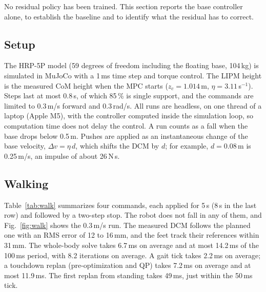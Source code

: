 \documentclass[conference]{IEEEtran}
\begin{document}
No residual policy has been trained.
This section reports the base controller alone, to establish the baseline and to identify what the residual has to correct.

\subsection{Setup}
The HRP-5P model (59 degrees of freedom including the floating base, 104\,kg) is simulated in MuJoCo \cite{todorov2012mujoco} with a 1\,ms time step and torque control.
The LIPM height is the measured CoM height when the MPC starts ($z_c=1.014$\,m, $\eta=3.11$\,s$^{-1}$).
Steps last at most 0.8\,s, of which 85\,\% is single support, and the commands are limited to 0.3\,m/s forward and 0.3\,rad/s.
All runs are headless, on one thread of a laptop (Apple M5), with the controller computed inside the simulation loop, so computation time does not delay the control.
A run counts as a fall when the base drops below 0.5\,m.
Pushes are applied as an instantaneous change of the base velocity, $\Delta v=\eta\,d$, which shifts the DCM by $d$; for example, $d=0.08$\,m is 0.25\,m/s, an impulse of about 26\,N\,s.

\subsection{Walking}
Table~\ref{tab:walk} summarizes four commands, each applied for 5\,s (8\,s in the last row) and followed by a two-step stop.
The robot does not fall in any of them, and Fig.~\ref{fig:walk} shows the 0.3\,m/s run.
The measured DCM follows the planned one with an RMS error of 12 to 16\,mm, and the feet track their references within 31\,mm.
The whole-body solve takes 6.7\,ms on average and at most 14.2\,ms of the 100\,ms period, with 8.2 iterations on average.
A gait tick takes 2.2\,ms on average; a touchdown replan (pre-optimization and QP) takes 7.2\,ms on average and at most 11.9\,ms.
The first replan from standing takes 49\,ms, just within the 50\,ms tick.
\end{document}
